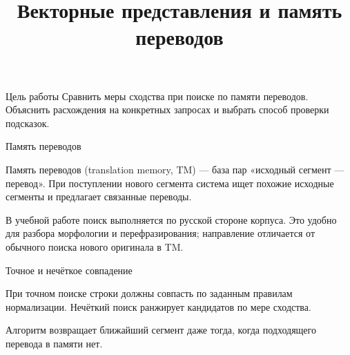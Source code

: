 \documentclass[aspectratio=169,12pt]{beamer}
\author{}\date{}
\title{Векторные представления и память переводов}
\begin{document}
\begin{frame}[plain]\vspace{0.6cm}{\large Лабораторная работа № 2: сходство строк, поиск и интерпретация результатов\par}\end{frame}
\begin{frame}{Цель работы}
\color{ink}
{\small Сравнить меры сходства при поиске по памяти переводов. Объяснить расхождения на конкретных запросах и выбрать способ проверки подсказок.}
\end{frame}

\begin{frame}{Память переводов}
\color{ink}
{\small Память переводов (translation memory, TM) — база пар «исходный сегмент — перевод». При поступлении нового сегмента система ищет похожие исходные сегменты и предлагает связанные переводы.
\par\vspace{0.6em}В учебной работе поиск выполняется по русской стороне корпуса. Это удобно для разбора морфологии и перефразирования; направление отличается от обычного поиска нового оригинала в TM.}
\end{frame}

\begin{frame}{Точное и нечёткое совпадение}
\color{ink}
{\small При точном поиске строки должны совпасть по заданным правилам нормализации. Нечёткий поиск ранжирует кандидатов по мере сходства.
\par\vspace{0.6em}Алгоритм возвращает ближайший сегмент даже тогда, когда подходящего перевода в памяти нет.}
\end{frame}
\end{document}
